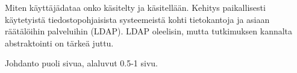 Miten käyttäjädataa onko käsitelty ja käsitellään. Kehitys paikallisesti käytetyistä tiedostopohjaisista systeemeistä kohti tietokantoja ja asiaan räätälöihin palveluihin (LDAP). LDAP oleelisin, mutta tutkimuksen kannalta abstraktointi on tärkeä juttu.

Johdanto puoli sivua, alaluvut 0.5-1 sivu.